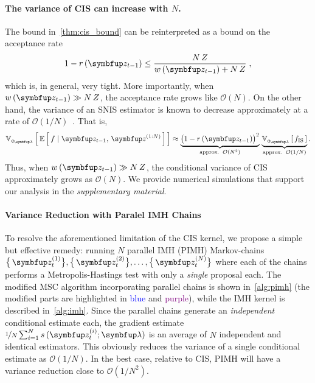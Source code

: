 \paragraph{The variance of CIS can increase with \(N\).}
The bound in~\cref{thm:cis_bound} can be reinterpreted as a bound on the acceptance rate 
\begin{align}
  1 - r\,(\vz_{t-1}) \leq \frac{N\,Z}{ w\,(\vz_{t-1}) + N\,Z}\;,
\end{align}
which is, in general, very tight.
More importantly, when \(w\,(\vz_{t-1}) \gg N\,Z\), the acceptance rate grows like \(\mathcal{O}(N)\).
On the other hand, the variance of an SNIS estimator is known to decrease approximately at a rate of \(\mathcal{O}(1/N)\)~\citep{kong_sequential_1994, robert_monte_2004, elvira_rethinking_2018}.
That is, 
\begin{align}
  \Vsub{q_{\vlambda}}{ \E{ f \mid \vz_{t-1},\,\vz^{(1:N)} } } \approx \underbrace{{\big(1 - r\,(\vz_{t-1})\big)}^2}_{\text{approx.}\;\;\mathcal{O}(N^2)} \,
  \underbrace{\Vsub{q_{\vlambda}}{ f_{\text{IS}} }}_{\text{approx.}\;\;\mathcal{O}(1/N)}.\label{eq:cis_variance_incr}
\end{align}
Thus, when \(w\,(\vz_{t-1})\gg N\,Z\), the conditional variance of CIS approximately grows as \(\mathcal{O}(N)\).
We provide numerical simulations that support our analysis in the \textit{supplementary material}.

\vspace{-0.02in}


\vspace{-0.1in}
\paragraph{Variance Reduction with Paralel IMH Chains}
To resolve the aforementioned limitation of the CIS kernel, we propose a simple but effective remedy: running \(N\) parallel IMH (PIMH) Markov-chains \( \big\{\,\vz_t^{(1)}\big\}, \big\{\,\vz_t^{(2)}\big\}, \ldots, \big\{\,\vz_t^{(N)}\big\}\) where each of the chains performs a Metropolis-Hastings test with only a \textit{single} proposal each.
The modified MSC algorithm incorporating parallel chains is shown in~\cref{alg:pimh} (the modified parts are highlighted in \textcolor{blue}{blue} and \textcolor{purple}{purple}), while the IMH kernel is described in~\cref{alg:imh}.
Since the parallel chains generate an \textit{independent} conditional estimate each, the gradient estimate \(\nicefrac{1}{N} \sum^{N}_{i=1} s\,(\vz_t^{(i)}; \vlambda)\) is an average of \(N\) independent and identical estimators.
This obviously reduces the variance of a single conditional estimate as \(\mathcal{O}(1/N)\).
In the best case, relative to CIS, PIMH will have a variance reduction close to \(\mathcal{O}(1/N^2)\).
%
%

